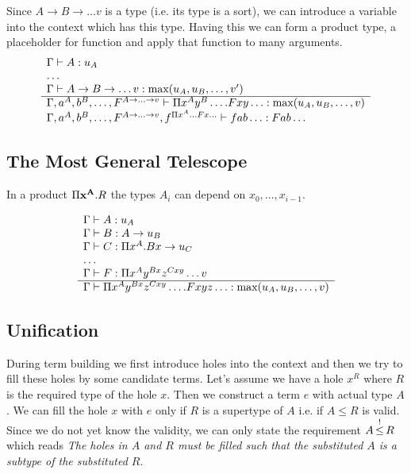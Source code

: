 Since $A \to B \to \ldots v$ is a type (i.e. its type is a sort), we can
introduce a variable into the context which has this type. Having this we can
form a product type, a placeholder for function and apply that function to many
arguments.
%
$$
\rulev
{
    \Gamma \vdash A: u_A
    \\ \ldots \\
    \Gamma \vdash A \to B \to \ldots v : \max(u_A, u_B, \ldots, v')
}
{
    \Gamma, a^A, b^B, \ldots, F^{A\to \ldots \to v}
    \vdash
    \Pi x^A y^B \ldots. F x y \ldots: \max(u_A, u_B, \ldots, v)

    \\
    \Gamma, a^A, b^B, \ldots, F^{A\to \ldots \to v}, f^{\Pi x^A \ldots F x \ldots}
    \vdash
    f a b \ldots : F a b \ldots
}
$$




\subsection{The Most General Telescope}


In a product $\Pi \mathbf{x}^{\mathbf{A}}. R$ the types $A_i$ can depend on $x_0, \ldots,
x_{i-1}$.

$$
\begin{array}{l} 
    \Gamma \vdash A: u_A
    \\
    \Gamma \vdash B: A \to u_B
    \\
    \Gamma \vdash C: \Pi x^A. B x \to u_C
    \\
    \ldots
    \\
    \Gamma \vdash F: \Pi x^A y^{B x} z^{C x y} \ldots v
 \\ \hline 
    \Gamma
    \vdash
    \Pi x^A y^{B x} z^{C x y} \ldots . F x y z \ldots
    :
    \text{max}(u_A, u_B, \ldots, v)
\end{array}
$$








\subsection{Unification}

During term building we first introduce holes into the context and then we try
to fill these holes by some candidate terms. Let's assume we have a hole $x^R$
where $R$ is the required type of the hole $x$. Then we construct a term $e$
with actual type $A$. We can fill the hole $x$ with $e$ only if $R$ is a
supertype of $A$ i.e. if $A \le R$ is valid. Since we do not yet know the
validity, we can only state the requirement $A {\,\stackrel{!}{\le}\,} R$ which reads \emph{The
holes in $A$ and $R$ must be filled such that the substituted $A$ is a subtype
of the substituted $R$}.



